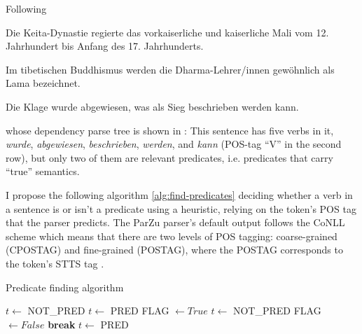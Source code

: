Following \cite{foth2006umfassende}

\begin{examples}
	\label{ex:one-predicate}
	\item Die Keita-Dynastie regierte das vorkaiserliche und kaiserliche Mali vom 12. Jahrhundert bis Anfang des 17. Jahrhunderts.
\end{examples}

\begin{examples}
	\label{ex:one-predicate-mod}
	\item Im tibetischen Buddhismus werden die Dharma-Lehrer/innen gewöhnlich als Lama bezeichnet.
\end{examples}

\begin{examples}
	\label{ex:multiple-predicates}
	\item Die Klage wurde abgewiesen, was als Sieg beschrieben werden kann.
\end{examples}

whose dependency parse tree is shown in : This sentence has five
verbs in it, \textit{wurde}, \textit{abgewiesen}, \textit{beschrieben}, \textit{werden}, and
\textit{kann} (POS-tag ``V'' in the second row), but only two of them are relevant predicates,
i.e. predicates that carry ``true'' semantics.


I propose the following algorithm \ref{alg:find-predicates} deciding whether a verb in a sentence
is or isn't a predicate using a heuristic, relying on the token's POS tag that the parser
predicts.  The ParZu parser's default output follows the CoNLL scheme \citep{buchholz2006conll}
which means that there are two levels of POS tagging: coarse-grained (CPOSTAG) and fine-grained
(POSTAG), where the POSTAG corresponds to the token's STTS tag \citep{schiller1999guidelines}.

\begin{algorithm}
\caption{Predicate finding algorithm}
\label{alg:find-predicates}
	\begin{algorithmic}[1]
			\STATE $t \leftarrow$ NOT\_PRED
		\ELSE
				\STATE $t \leftarrow$ PRED
			\ELSE
				\STATE FLAG $\leftarrow True$
						\STATE $t \leftarrow$ NOT\_PRED
						\STATE FLAG $\leftarrow False$
						\STATE \textbf{break}
					\ENDIF
				\ENDFOR
				\IF{FLAG $= True$}
					\STATE $t \leftarrow$ PRED
				\ENDIF
			\ENDIF
		\ENDIF
	\ENDFOR
\end{algorithmic}
\end{algorithm}

